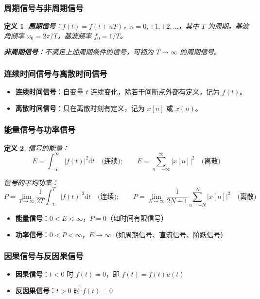 \documentclass[11pt,a4paper]{ctexart}
\newtheorem{definition}{定义}[section]
\newcommand{\dd}{\mathrm{d}}            %
\begin{document}
\subsubsection{周期信号与非周期信号}
\begin{definition}
\textbf{周期信号}：$f(t) = f(t + nT)$，$n = 0,\pm 1,\pm 2,\ldots$，其中 $T$ 为周期。基波角频率 $\omega_0 = 2\pi/T$，基波频率 $f_0 = 1/T$。

\textbf{非周期信号}：不满足上述周期条件的信号，可视为 $T \to \infty$ 的周期信号。
\end{definition}

\subsubsection{连续时间信号与离散时间信号}
\begin{itemize}
    \item \textbf{连续时间信号}：自变量 $t$ 连续变化，除若干间断点外都有定义，记为 $f(t)$。
    \item \textbf{离散时间信号}：只在离散时刻有定义，记为 $x[n]$ 或 $x(n)$。
\end{itemize}

\subsubsection{能量信号与功率信号}
\begin{definition}
信号的能量：
\[
E = \int_{-\infty}^{\infty} |f(t)|^2 \dd t \quad \text{(连续)};\qquad
E = \sum_{n=-\infty}^{\infty} |x[n]|^2 \quad \text{(离散)}
\]

信号的平均功率：
\[
P = \lim_{T\to\infty} \frac{1}{2T}\int_{-T}^{T} |f(t)|^2 \dd t \quad \text{(连续)};\qquad
P = \lim_{N\to\infty} \frac{1}{2N+1}\sum_{n=-N}^{N} |x[n]|^2 \quad \text{(离散)}
\]
\end{definition}

\begin{itemize}
    \item \textbf{能量信号}：$0 < E < \infty$，$P = 0$（如时间有限信号）
    \item \textbf{功率信号}：$0 < P < \infty$，$E \to \infty$（如周期信号、直流信号、阶跃信号）
\end{itemize}

\subsubsection{因果信号与反因果信号}
\begin{itemize}
    \item \textbf{因果信号}：$t < 0$ 时 $f(t) = 0$，即 $f(t) = f(t)u(t)$
    \item \textbf{反因果信号}：$t > 0$ 时 $f(t) = 0$
\end{itemize}
\end{document}
